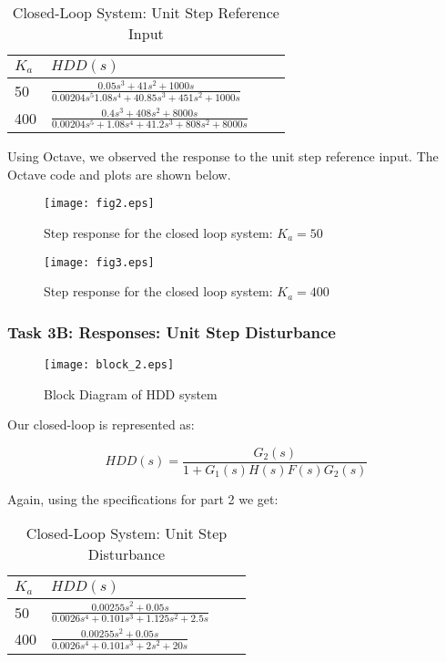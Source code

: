 \documentclass{article}
\newcommand{\matlab}[1]{%
%
}
\begin{document}
\begin{table}[H]
\begin{center}
  \begin{tabular}{ | l | l | l | p{5cm} |}
  \hline
  \textbf{$K_a$} & \textbf{$HDD(s)$}  \\ \hline
  50 & $\frac{0.05s^3 + 41s^2 + 1000s}{0.00204s^5 1.08s^4 + 40.85 s^3 
  + 451 s^2  + 1000s}$\\ \hline 
  400 & $\frac{0.4s^3 + 408s^2 + 8000s}{0.00204s^5 + 1.08s^4 + 41.2 s^3
  + 808 s^2 + 8000 s}$  \\ \hline
 \end{tabular}
\end{center}
\caption{Closed-Loop System: Unit Step Reference Input}
\end{table}

Using Octave, we observed the response to the unit step reference input. The
Octave code and plots are shown below. 

\matlab{fig2.m}

\begin{figure}[H]
  \caption{Step response for the closed loop system: $K_a = 50$}
  \centering
  \texttt{[image: fig2.eps]}
\end{figure}

\matlab{fig3.m}

\begin{figure}[H]
  \caption{Step response for the closed loop system: $K_a = 400$}
  \centering
  \texttt{[image: fig3.eps]}
\end{figure}

\subsubsection*{Task 3B: Responses: Unit Step Disturbance}

\begin{figure}[H]
  \centering
  \caption{Block Diagram of HDD system}
  \texttt{[image: block\_2.eps]}
\end{figure}


Our closed-loop is represented as: 

$$ HDD(s) = \frac{G_2(s)}{1 + G_1(s)H(s)F(s)G_2(s)} $$ 

Again, using the specifications for part 2 we get:

\begin{table}[H]
\begin{center}
  \begin{tabular}{ | l | l | l | p{5cm} |}
  \hline
  \textbf{$K_a$} & \textbf{$HDD(s)$}  \\ \hline
  50 & $\frac{0.00255s^2 + 0.05s}{0.0026s^4 + 0.101s^3 + 1.125s^2 + 2.5s}$\\ \hline 
  400 & $\frac{0.00255s^2 + 0.05s}{0.0026s^4 + 0.101s^3 + 2s^2 + 20s}$\\ \hline 
 \end{tabular}
\end{center}
\caption{Closed-Loop System: Unit Step Disturbance}
\end{table}
\end{document}
